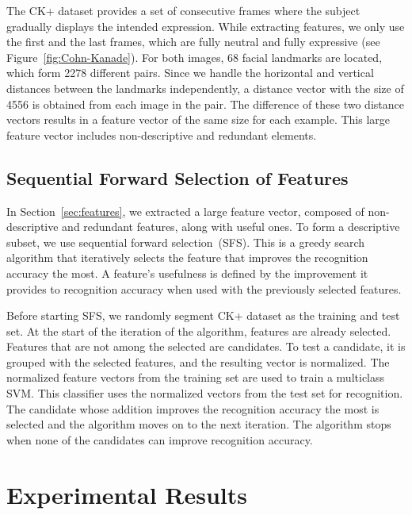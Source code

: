 \documentclass[hyperfootnotes=false]{article}
\begin{document}
The CK+ dataset provides a set of consecutive frames where the subject gradually displays the intended expression.
While extracting features, we only use the first and the last frames, which are fully neutral and fully expressive (see Figure~\ref{fig:Cohn-Kanade}).
For both images, 68 facial landmarks are located, which form 2278 different pairs.
Since we handle the horizontal and vertical distances between the landmarks independently, a distance vector with the size of 4556 is obtained from each image in the pair.
The difference of these two distance vectors results in a feature vector of the same size for each example.
This large feature vector includes non-descriptive and redundant elements.

\subsection{Sequential Forward Selection of Features}
\label{sec:sfs}

In Section~\ref{sec:features}, we extracted a large feature vector, composed of non-descriptive and redundant features, along with useful ones.
To form a descriptive subset, we use sequential forward selection~(SFS).
This is a greedy search algorithm that iteratively selects the feature that improves the recognition accuracy the most.
A feature's usefulness is defined by the improvement it provides to recognition accuracy when used with the previously selected features.

Before starting SFS, we randomly segment CK+ dataset as the training and test set.
At the start of the  iteration of the algorithm,  features are already selected.
Features that are not among the selected are candidates.
To test a candidate, it is grouped with the selected features, and the resulting vector is  normalized.
The normalized feature vectors from the training set are used to train a multiclass SVM.
This classifier uses the normalized vectors from the test set for recognition.
The candidate whose addition improves the recognition accuracy the most is selected and the algorithm moves on to the next iteration.
The algorithm stops when none of the candidates can improve recognition accuracy.

\section{Experimental Results}
\end{document}
